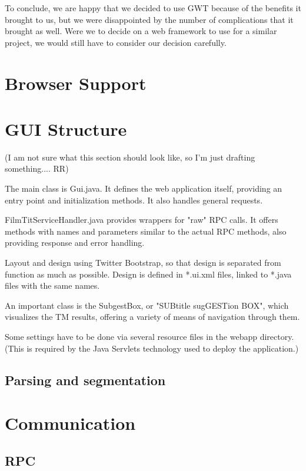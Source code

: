 To conclude, we are happy that we decided to use GWT because of the benefits it brought to us, but we were disappointed by the number of complications that it brought as well. Were we to decide on a web framework to use for a similar project, we would still have to consider our decision carefully.

\section{Browser Support}


\section{GUI Structure}

(I am not sure what this section should look like, so I'm just drafting something.... RR)

The main class is Gui.java. It defines the web application itself, providing an entry point and initialization methods. It also handles general requests.

FilmTitServiceHandler.java provides wrappers for "raw" RPC calls. It offers methods with names and parameters similar to the actual RPC methods, also providing response and error handling.

Layout and design using Twitter Bootstrap, so that design is separated from function as much as possible. Design is defined in *.ui.xml files, linked to *.java files with the same names.

An important class is the SubgestBox, or "SUBtitle sugGESTion BOX", which visualizes the TM results, offering a variety of means of navigation through them.

Some settings have to be done via several resource files in the webapp directory. (This is required by the Java Servlets technology used to deploy the application.)

\subsection{Parsing and segmentation}


\section{Communication}
\subsection{RPC}

